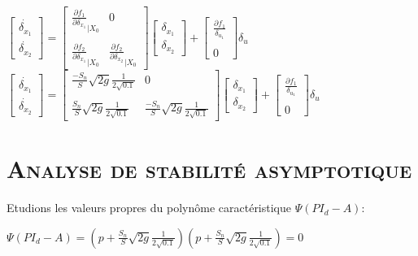 $\begin{bmatrix} \dot{\delta_x_1} \\ \dot{\delta_x_2} \end{bmatrix} = \begin{bmatrix} \frac{\partial f_1}{\partial \delta_x_1}_{|X_0}  &  0  \\\\ \frac{\partial f_2}{\partial \delta_x_1}_{|X_0} &  \frac{\partial f_2}{\partial \delta_x_2}_{|X_0}  \end{bmatrix} \begin{bmatrix} \delta_x_1 \\ \delta_x_2 \end{bmatrix} + \begin{bmatrix} \frac{\partial f_1}{\delta_u_1} \\\\ 0  \end{bmatrix} \delta_u $\\[0.5 cm]

$\begin{bmatrix} \dot{\delta_x_1} \\ \dot{\delta_x_2} \end{bmatrix} = \begin{bmatrix} \frac{-S_n}{S} \sqrt{2g} \frac{1}{2\sqrt{0.1}}  &  0 \\\\ \frac{S_n}{S} \sqrt{2g} \frac{1}{2\sqrt{0.1}}  &  \frac{-S_n}{S} \sqrt{2g} \frac{1}{2\sqrt{0.1}}   \end{bmatrix} \begin{bmatrix} \delta_x_1 \\ \delta_x_2 \end{bmatrix} + \begin{bmatrix} \frac{\partial f_1}{\delta_u_1} \\\\ 0  \end{bmatrix} \delta_u$ 
   
 \section{\textsc{Analyse de stabilité asymptotique }}
 
 \par Etudions les valeurs propres du polynôme caractéristique $\Psi(PI_d-A)$:\\ 
   
   \begin{center}
		$ \Psi(PI_d-A) = (p+\frac{S_n}{S} \sqrt{2g} \frac{1}{2\sqrt{0.1}})(p+\frac{S_n}{S} \sqrt{2g} \frac{1}{2\sqrt{0.1}}) =0 $
   \end{center}
   
